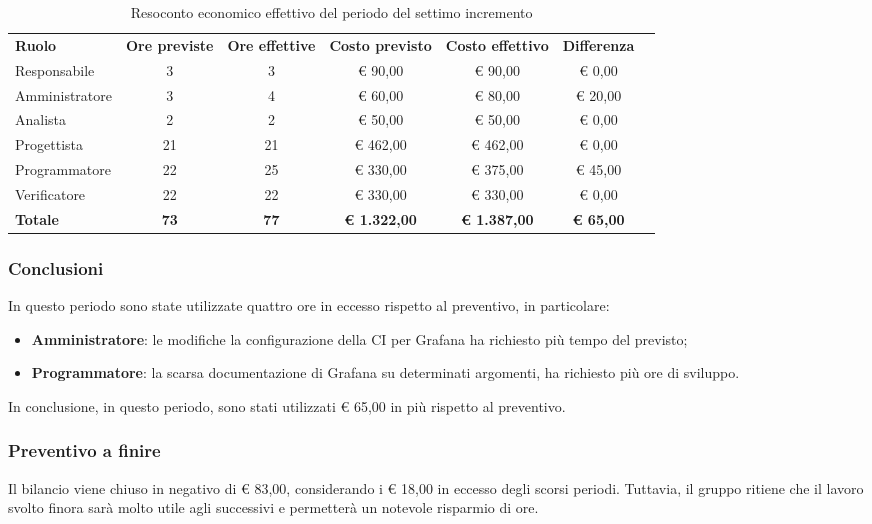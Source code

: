 \documentclass[../piano-di-progetto.tex]{subfiles}
\begin{document}
  \begin{table}[H]
    \centering
    \begin{tabular}{lcccccc}
      \rowcolor{lightgray}
      \textbf{Ruolo}  & \textbf{Ore previste} & \textbf{Ore effettive} & \textbf{Costo previsto} & \textbf{Costo effettivo} & \textbf{Differenza} \\
Responsabile    & 3           & 3           & € 90,00             & € 90,00             & € 0,00           \\
Amministratore  & 3           & 4           & € 60,00             & € 80,00             & € 20,00          \\
Analista        & 2           & 2           & € 50,00             & € 50,00             & € 0,00           \\
Progettista     & 21          & 21          & € 462,00            & € 462,00            & € 0,00           \\
Programmatore   & 22          & 25          & € 330,00            & € 375,00            & € 45,00          \\
Verificatore    & 22          & 22          & € 330,00            & € 330,00            & € 0,00           \\
\textbf{Totale} & \textbf{73} & \textbf{77} & \textbf{€ 1.322,00} & \textbf{€ 1.387,00} & \textbf{€ 65,00}
    \end{tabular}
    \caption{Resoconto economico effettivo del periodo del settimo incremento}
  \end{table}


\subsubsection{Conclusioni}
In questo periodo sono state utilizzate quattro ore in eccesso rispetto al preventivo, in particolare:
\begin{itemize}
    \item \textbf{Amministratore}: le modifiche la configurazione della CI per Grafana ha richiesto più tempo del previsto;
    \item \textbf{Programmatore}: la scarsa documentazione di Grafana su determinati argomenti, ha richiesto più ore di sviluppo.
\end{itemize}
In conclusione, in questo periodo, sono stati utilizzati € 65,00 in più rispetto al preventivo.

\subsubsection{Preventivo a finire}
Il bilancio viene chiuso in negativo di € 83,00, considerando i € 18,00 in eccesso degli scorsi periodi. Tuttavia, il gruppo ritiene che il lavoro svolto finora sarà molto utile agli successivi e permetterà un notevole risparmio di ore.
\end{document}
